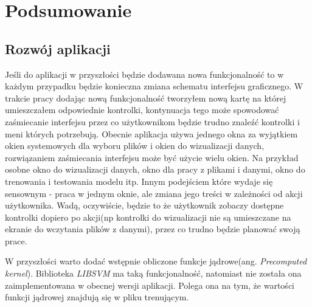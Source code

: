 \documentclass[paper=a4, fontsize=11pt]{scrartcl} %
\numberwithin{equation}{section} %
\numberwithin{figure}{section} %
\begin{document}
\newpage
\section{Podsumowanie} %



\subsection{Rozwój aplikacji}
    \par Jeśli do aplikacji w przyszłości będzie dodawana nowa funkcjonalność to w każdym
    przypadku będzie konieczna zmiana schematu interfejsu graficznego. W trakcie pracy dodając
    nową funkcjonalność tworzyłem nową kartę na której umieszczałem odpowiednie kontrolki,
    kontynuacja tego może spowodować zaśmiecanie interfejsu przez co użytkownikom będzie trudno
    znaleźć kontrolki i meni których potrzebują. Obecnie aplikacja używa jednego okna za
    wyjątkiem okien systemowych dla wyboru plików i okien do wizualizacji danych, rozwiązaniem
    zaśmiecania interfejsu może być użycie wielu okien. Na przykład osobne okno do wizualizacji
    danych, okno dla pracy z plikami i danymi, okno do trenowania i testowania modelu itp. Innym
    podejściem które wydaje się sensownym - praca w jednym oknie, ale zmiana jego treści w
    zależności od akcji użytkownika. Wadą, oczywiście, będzie to że użytkownik zobaczy dostępne
    kontrolki dopiero po akcji(np kontrolki do wizualizacji nie są umieszczane na ekranie do
    wczytania plików z danymi), przez co trudno będzie planować swoją prace. 

    \par W przyszłości warto dodać wstępnie obliczone funkcje jądrowe(ang. \textit{Precomputed
    kernel}). Biblioteka \textit{LIBSVM} ma taką funkcjonalność, natomiast nie została ona
    zaimplementowana w obecnej wersji aplikacji. Polega ona na tym, że wartości funkcji jądrowej
    znajdują się w pliku trenującym.
\end{document}
